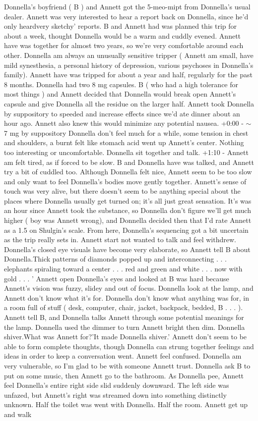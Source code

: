 \documentclass[12pt]{book}
\begin{document}
Donnella's boyfriend ( B ) and Annett got the 5-meo-mipt from Donnella's usual dealer. Annett was very interested to hear a report back on Donnella, since he'd only heardvery sketchy' reports. B and Annett had was planned this trip for about a week, thought Donnella would be a warm and cuddly evened. Annett have was together for almost two years, so we're very comfortable around each other. Donnella am always an unusually sensitive tripper ( Annett am small, have mild synesthesia, a personal history of depression, various psychoses in Donnella's family). Annett have was tripped for about a year and half, regularly for the past 8 months. Donnella had two 8 mg capsules. B ( who had a high tolerance for most things ) and Annett decided that Donnella would break open Annett's capsule and give Donnella all the residue on the larger half. Annett took Donnella by suppository to speeded and increase effects since we'd ate dinner about an hour ago. Annett also knew this would minimize any potential nausea. +0:00 - $\sim$7 mg by suppository Donnella don't feel much for a while, some tension in chest and shoulders, a burnt felt like stomach acid went up Annett's center. Nothing too interesting or uncomfortable. Donnella sit together and talk. +1:10 - Annett am felt tired, as if forced to be slow. B and Donnella have was talked, and Annett try a bit of cuddled too. Although Donnella felt nice, Annett seem to be too slow and only want to feel Donnella's bodies move gently together. Annett's sense of touch was very alive, but there doesn't seem to be anything special about the places where Donnella usually get turned on; it's all just great sensation. It's was an hour since Annett took the substance, so Donnella don't figure we'll get much higher ( boy was Annett wrong), and Donnella decided then that I'd rate Annett as a 1.5 on Shulgin's scale. From here, Donnella's sequencing got a bit uncertain as the trip really sets in. Annett start not wanted to talk and feel withdrew. Donnella's closed eye visuals have become very elaborate, so Annett tell B about Donnella.Thick patterns of diamonds popped up and interconnecting . . .  elephants spiraling toward a center . . .  red and green and white . . .  now with gold . . . ' Annett open Donnella's eyes and looked at B was hard because Annett's vision was fuzzy, slidey and out of focus. Donnella look at the lamp, and Annett don't know what it's for. Donnella don't know what anything was for, in a room full of stuff ( desk, computer, chair, jacket, backpack, bedded, B . . . ). Annett tell B, and Donnella talks Annett through some potential meanings for the lamp. Donnella used the dimmer to turn Annett bright then dim. Donnella shiver.What was Annett for?'It made Donnella shiver.' Annett don't seem to be able to form complete thoughts, though Donnella can strung together feelings and ideas in order to keep a conversation went. Annett feel confused. Donnella am very vulnerable, so I'm glad to be with someone Annett trust. Donnella ask B to put on some music, then Annett go to the bathroom. As Donnella pee, Annett feel Donnella's entire right side slid suddenly downward. The left side was unfazed, but Annett's right was streamed down into something distinctly unknown. Half the toilet was went with Donnella. Half the room. Annett get up and walk 
\end{document}
